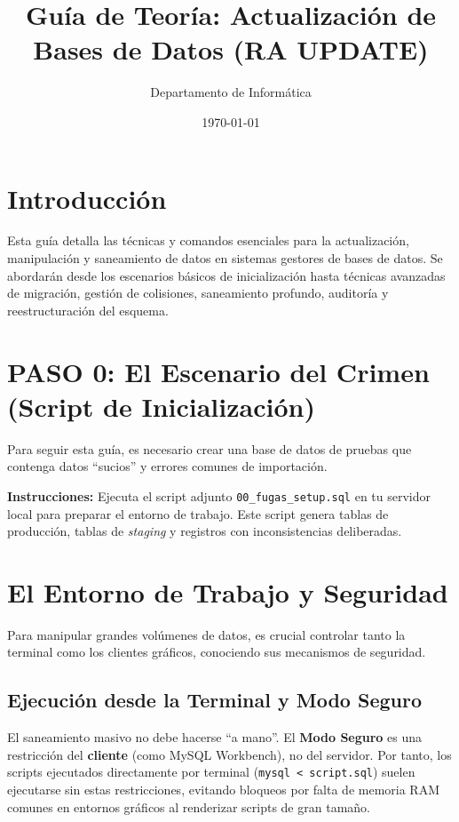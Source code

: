 \documentclass[12pt,a4paper]{article}
\title{\textbf{Guía de Teoría: Actualización de Bases de Datos (RA UPDATE)}}
\author{Departamento de Informática}
\date{\today}
\begin{document}
\maketitle

\section*{Introducción}
Esta guía detalla las técnicas y comandos esenciales para la actualización, manipulación y saneamiento de datos en sistemas gestores de bases de datos. 
%
Se abordarán desde los escenarios básicos de inicialización hasta técnicas avanzadas de migración, gestión de colisiones, saneamiento profundo, auditoría y reestructuración del esquema.

\section{PASO 0: El Escenario del Crimen (Script de Inicialización)}
Para seguir esta guía, es necesario crear una base de datos de pruebas que contenga datos ``sucios'' y errores comunes de importación.

\textbf{Instrucciones:} Ejecuta el script adjunto \texttt{00\_fugas\_setup.sql} en tu servidor local para preparar el entorno de trabajo. 
%
Este script genera tablas de producción, tablas de \textit{staging} y registros con inconsistencias deliberadas.



\section{El Entorno de Trabajo y Seguridad}
Para manipular grandes volúmenes de datos, es crucial controlar tanto la terminal como los clientes gráficos, conociendo sus mecanismos de seguridad.

\subsection{Ejecución desde la Terminal y Modo Seguro}
\begin{tcolorbox}[title=Tip de terminal vs GUI]
El saneamiento masivo no debe hacerse ``a mano''. El \textbf{Modo Seguro} es una restricción del \textbf{cliente} (como MySQL Workbench), no del servidor. Por tanto, los scripts ejecutados directamente por terminal (\texttt{mysql < script.sql}) suelen ejecutarse sin estas restricciones, evitando bloqueos por falta de memoria RAM comunes en entornos gráficos al renderizar scripts de gran tamaño.
\end{tcolorbox}
\end{document}
